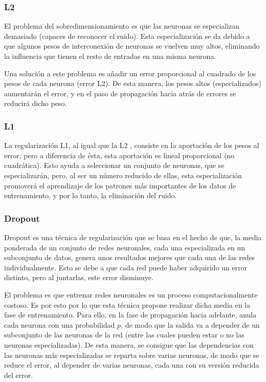 \subsubsection{L2}
El problema del sobredimensionamiento es que las neuronas se especializan demasiado (capaces de reconocer el ruido). Esta especialización se da debido a que algunos pesos de interconexión de neuronas se vuelven muy altos, eliminando la influencia que tienen el resto de entradas en una misma neurona.

Una solución a este problema es añadir un error proporcional al cuadrado de los pesos de cada neurona (error L2). De esta manera, los pesos altos (especializados) aumentarán el error, y en el paso de propagación hacia atrás de errores se reducirá dicho peso.
\subsubsection{L1}
La regularización L1, al igual que la L2 \cite{ng2004feature}, consiste en la aportación de los pesos al error, pero a diferencia de ésta, esta aportación es lineal proporcional (no cuadrática). Esto ayuda a seleccionar un conjunto de neuronas, que se especializarán, pero, al ser un número reducido de ellas, esta especialización promoverá el aprendizaje de los patrones más importantes de los datos de entrenamiento, y por lo tanto, la eliminación del ruido.
\subsubsection{Dropout}
Dropout \cite{gal2015theoretically} es una técnica de regularización que se basa en el hecho de que, la media ponderada de un conjunto de redes neuronales, cada una especializada en un subconjunto de datos, genera unos resultados mejores que cada una de las redes individualmente. Esto se debe a que cada red puede haber adquirido un error distinto, pero al juntarlas, este error disminuye.

El problema es que entrenar redes neuronales es un proceso computacionalmente costoso. Es por esto por lo que esta técnica propone realizar dicha media en la fase de entrenamiento. Para ello, en la fase de propagación hacia adelante, anula cada neurona con una probabilidad $p$, de modo que la salida va a depender de un subconjunto de las neuronas de la red (entre las cuales pueden estar o no las neuronas especializadas). De esta manera, se consigue que las dependencias con las neuronas más especializadas se reparta sobre varias neuronas, de modo que se reduce el error, al depender de varias neuronas, cada una con su versión reducida del error.
